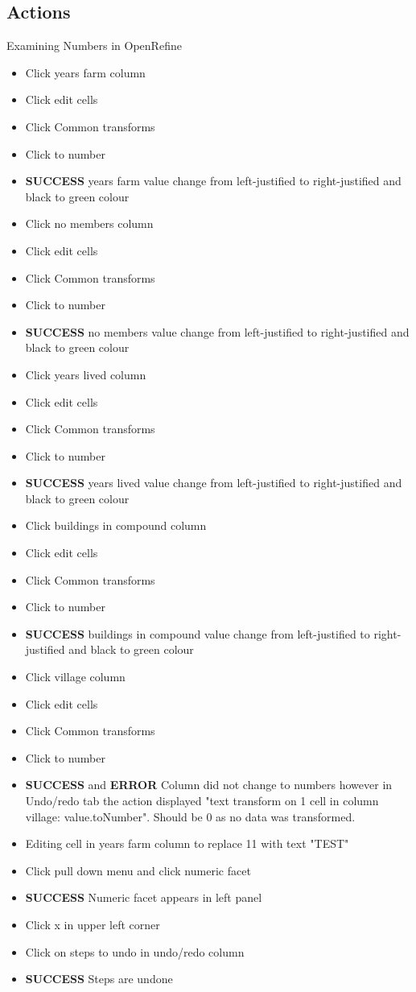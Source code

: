 \documentclass{article}
\begin{document}
\subsection{Actions}
Examining Numbers in OpenRefine
\begin{itemize}
\item Click years farm column 
\item Click edit cells 
\item Click Common transforms
\item Click to number
\item \textbf{SUCCESS} years farm value change from left-justified to right-justified and black to green colour
\item Click no members column 
\item Click edit cells 
\item Click Common transforms
\item Click to number
\item \textbf{SUCCESS} no members value change from left-justified to right-justified and black to green colour
\item Click years lived column 
\item Click edit cells 
\item Click Common transforms
\item Click to number
\item \textbf{SUCCESS} years lived value change from left-justified to right-justified and black to green colour
\item Click buildings in compound column 
\item Click edit cells 
\item Click Common transforms
\item Click to number
\item \textbf{SUCCESS} buildings in compound value change from left-justified to right-justified and black to green colour
\item Click village column 
\item Click edit cells 
\item Click Common transforms
\item Click to number
\item \textbf{SUCCESS} and \textbf{ERROR} Column did not change to numbers however in Undo/redo tab the action displayed "text transform on 1 cell in column village: value.toNumber". Should be 0 as no data was transformed. 
\item Editing cell in years farm column to replace 11 with text "TEST"
\item Click pull down menu and click numeric facet
\item \textbf{SUCCESS} Numeric facet appears in left panel
\item Click x in upper left corner
\item Click on steps to undo in undo/redo column
\item \textbf{SUCCESS} Steps are undone
\end{itemize}
\end{document}
